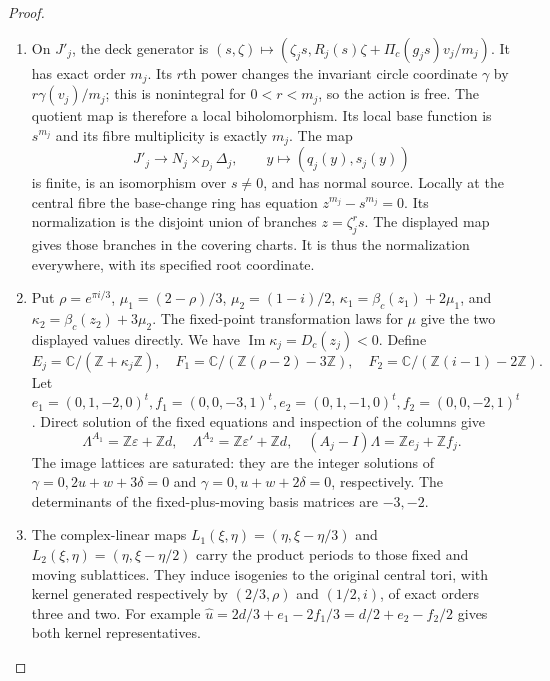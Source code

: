 \begin{proof}
\begin{enumerate}[label=\arabic*.,leftmargin=*]
\item On $J'_j$, the deck generator is
$(s,\zeta)\mapsto(\zeta_js,R_j(s)\zeta+\Pi_c(g_js)v_j/m_j)$. It has exact order $m_j$. Its $r$th power changes the invariant circle coordinate $\gamma$ by $r\gamma(v_j)/m_j$; this is nonintegral for $0<r<m_j$, so the action is free. The quotient map is therefore a local biholomorphism. Its local base function is $s^{m_j}$ and its fibre multiplicity is exactly $m_j$. The map
\[
 J'_j\longrightarrow N_j\times_{D_j}\Delta_j,\qquad y\longmapsto(q_j(y),s_j(y))
\]
is finite, is an isomorphism over $s\ne0$, and has normal source. Locally at the central fibre the base-change ring has equation $z^{m_j}-s^{m_j}=0$. Its normalization is the disjoint union of branches $z=\zeta_j^rs$. The displayed map gives those branches in the covering charts. It is thus the normalization everywhere, with its specified root coordinate.

\item Put $\rho=e^{\pi i/3}$, $\mu_1=(2-\rho)/3$, $\mu_2=(1-i)/2$, $\kappa_1=\beta_c(z_1)+2\mu_1$, and $\kappa_2=\beta_c(z_2)+3\mu_2$. The fixed-point transformation laws for $\mu$ give the two displayed values directly. We have $\operatorname{Im}\kappa_j=D_c(z_j)<0$. Define
\[
 E_j=\mathbb C/(\mathbb Z+\kappa_j\mathbb Z),\quad
 F_1=\mathbb C/(\mathbb Z(\rho-2)-3\mathbb Z),\quad
 F_2=\mathbb C/(\mathbb Z(i-1)-2\mathbb Z).
\]
Let $e_1=(0,1,-2,0)^t,f_1=(0,0,-3,1)^t,e_2=(0,1,-1,0)^t,f_2=(0,0,-2,1)^t$. Direct solution of the fixed equations and inspection of the columns give
\[
 \Lambda^{A_1}=\mathbb Z\varepsilon+\mathbb Zd,\quad
 \Lambda^{A_2}=\mathbb Z\varepsilon'+\mathbb Zd,\quad
 (A_j-I)\Lambda=\mathbb Ze_j+\mathbb Zf_j.
\]
The image lattices are saturated: they are the integer solutions of $\gamma=0,2u+w+3\delta=0$ and $\gamma=0,u+w+2\delta=0$, respectively. The determinants of the fixed-plus-moving basis matrices are $-3,-2$.

\item The complex-linear maps $L_1(\xi,\eta)=(\eta,\xi-\eta/3)$ and $L_2(\xi,\eta)=(\eta,\xi-\eta/2)$ carry the product periods to those fixed and moving sublattices. They induce isogenies to the original central tori, with kernel generated respectively by $(2/3,\rho)$ and $(1/2,i)$, of exact orders three and two. For example $\widehat u=2d/3+e_1-2f_1/3=d/2+e_2-f_2/2$ gives both kernel representatives.


\end{enumerate}
\end{proof}
